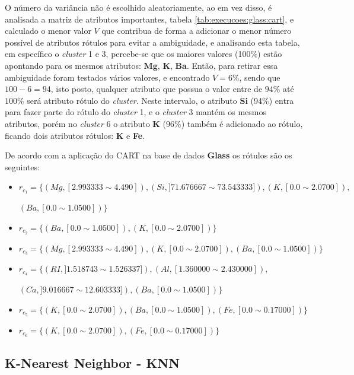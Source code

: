 O número da variância não é escolhido aleatoriamente, ao em vez disso, é analisada a matriz de atributos importantes, tabela  \ref{tab:execucoes:glass:cart}, e calculado o menor valor ${V}$ que contribua de forma a adicionar o menor número possível de atributos rótulos para  evitar a ambiguidade, e analisando esta tabela, em específico o \textit{cluster} 1 e 3, percebe-se que os maiores valores (100\%) estão apontando para os mesmos atributos: \textbf{Mg}, \textbf{K}, \textbf{Ba}. Então, para retirar essa ambiguidade foram testados vários valores, e encontrado ${V=6\%}$, sendo que ${100-6=94}$, isto posto, qualquer atributo que possua o valor entre de ${94\%}$ até ${100\%}$ será atributo rótulo do \textit{cluster}. Neste intervalo, o atributo \textbf{Si} (94\%) entra para  fazer parte do rótulo do \textit{cluster} 1, e o \textit{cluster} 3 mantém os mesmos atributos, porém no \textit{cluster} 6 o atributo \textbf{K} (96\%) também é adicionado ao rótulo, ficando dois atributos rótulos: \textbf{K} e \textbf{Fe}.


De acordo com a aplicação do CART na base de dados \textbf{Glass} os rótulos são os seguintes:
\begin{itemize}[noitemsep]
 \item ${r_{c_1}=\{ (Mg, [ 2.993333 \sim  4.490]), (Si,] 71.676667 \sim 73.543333 ]), (K,[ 0.0 \sim  2.0700 ] ), }$

 ${ (Ba,[ 0.0 \sim 1.0500 ] ) \} }$  
 \item ${r_{c_2}=\{(Ba,[ 0.0 \sim 1.0500 ] ), (K,[ 0.0 \sim  2.0700 ] ) \} }$
 \item ${r_{c_3}=\{ (Mg, [ 2.993333 \sim  4.490]), (K,[ 0.0 \sim  2.0700 ] ), (Ba,[ 0.0 \sim 1.0500 ] )  \} }$  
 \item ${r_{c_4}=\{ (RI,] 1.518743 \sim  1.526337 ] ), (Al,[ 1.360000 \sim  2.430000 ] ), }$
 
 ${(Ca,] 9.016667 \sim  12.603333] ), (Ba,[ 0.0 \sim 1.0500 ] ) \}}$

 \item ${r_{c_5}=\{ (K,[ 0.0 \sim  2.0700 ] ), (Ba,[ 0.0 \sim 1.0500 ] ), (Fe,[ 0.0 \sim 0.17000] ) \} }$
 \item ${r_{c_6}=\{ (K,[ 0.0 \sim  2.0700 ] ),(Fe,[ 0.0 \sim 0.17000] ) \} }$
\end{itemize}



\subsection{K-Nearest Neighbor - KNN} \label{cap:resultados:ssec:glass:knn}


